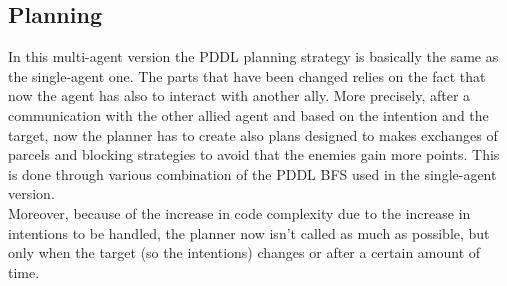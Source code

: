 \documentclass[a4paper, 11pt]{article}
\begin{document}
 
\subsection{Planning}

In this multi-agent version the PDDL planning strategy is basically the same as the single-agent one. The parts that have been changed relies on the fact that now the agent has also to interact with another ally. More precisely, after a communication with the other allied agent and based on the intention and the target, now the planner has to create also plans designed to makes exchanges of parcels and blocking strategies to avoid that the enemies gain more points. This is done through various combination of the PDDL BFS used in the single-agent version.\\
Moreover, because of the increase in code complexity due to the increase in intentions to be handled, the planner now isn't called as much as possible, but only when the target (so the intentions) changes or after a certain amount of time.

%
\end{document}
